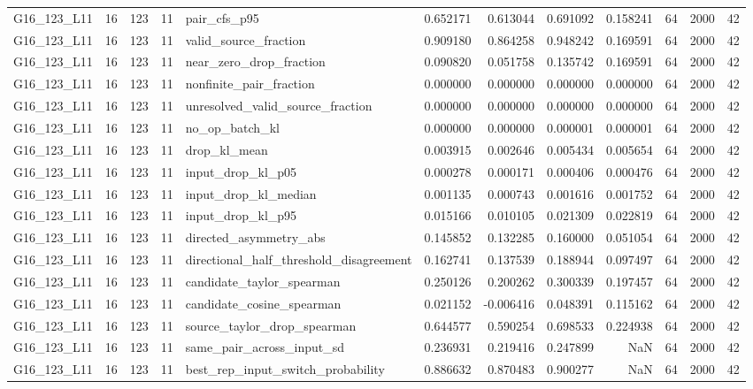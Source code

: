 \begin{tabular}{lrlrlrrrrrrr}
G16_123_L11 & 16 & 123 & 11 & pair_cfs_p95 & 0.652171 & 0.613044 & 0.691092 & 0.158241 & 64 & 2000 & 42 \\
G16_123_L11 & 16 & 123 & 11 & valid_source_fraction & 0.909180 & 0.864258 & 0.948242 & 0.169591 & 64 & 2000 & 42 \\
G16_123_L11 & 16 & 123 & 11 & near_zero_drop_fraction & 0.090820 & 0.051758 & 0.135742 & 0.169591 & 64 & 2000 & 42 \\
G16_123_L11 & 16 & 123 & 11 & nonfinite_pair_fraction & 0.000000 & 0.000000 & 0.000000 & 0.000000 & 64 & 2000 & 42 \\
G16_123_L11 & 16 & 123 & 11 & unresolved_valid_source_fraction & 0.000000 & 0.000000 & 0.000000 & 0.000000 & 64 & 2000 & 42 \\
G16_123_L11 & 16 & 123 & 11 & no_op_batch_kl & 0.000000 & 0.000000 & 0.000001 & 0.000001 & 64 & 2000 & 42 \\
G16_123_L11 & 16 & 123 & 11 & drop_kl_mean & 0.003915 & 0.002646 & 0.005434 & 0.005654 & 64 & 2000 & 42 \\
G16_123_L11 & 16 & 123 & 11 & input_drop_kl_p05 & 0.000278 & 0.000171 & 0.000406 & 0.000476 & 64 & 2000 & 42 \\
G16_123_L11 & 16 & 123 & 11 & input_drop_kl_median & 0.001135 & 0.000743 & 0.001616 & 0.001752 & 64 & 2000 & 42 \\
G16_123_L11 & 16 & 123 & 11 & input_drop_kl_p95 & 0.015166 & 0.010105 & 0.021309 & 0.022819 & 64 & 2000 & 42 \\
G16_123_L11 & 16 & 123 & 11 & directed_asymmetry_abs & 0.145852 & 0.132285 & 0.160000 & 0.051054 & 64 & 2000 & 42 \\
G16_123_L11 & 16 & 123 & 11 & directional_half_threshold_disagreement & 0.162741 & 0.137539 & 0.188944 & 0.097497 & 64 & 2000 & 42 \\
G16_123_L11 & 16 & 123 & 11 & candidate_taylor_spearman & 0.250126 & 0.200262 & 0.300339 & 0.197457 & 64 & 2000 & 42 \\
G16_123_L11 & 16 & 123 & 11 & candidate_cosine_spearman & 0.021152 & -0.006416 & 0.048391 & 0.115162 & 64 & 2000 & 42 \\
G16_123_L11 & 16 & 123 & 11 & source_taylor_drop_spearman & 0.644577 & 0.590254 & 0.698533 & 0.224938 & 64 & 2000 & 42 \\
G16_123_L11 & 16 & 123 & 11 & same_pair_across_input_sd & 0.236931 & 0.219416 & 0.247899 & NaN & 64 & 2000 & 42 \\
G16_123_L11 & 16 & 123 & 11 & best_rep_input_switch_probability & 0.886632 & 0.870483 & 0.900277 & NaN & 64 & 2000 & 42 \\

\end{tabular}
